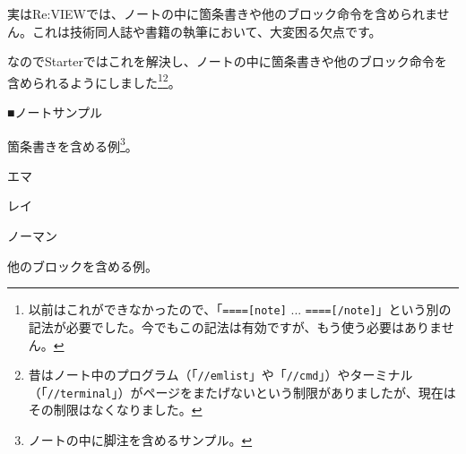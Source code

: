 実はRe:VIEWでは、ノートの中に箇条書きや他のブロック命令を含められません。これは技術同人誌や書籍の執筆において、大変困る欠点です。

なのでStarterではこれを解決し、ノートの中に箇条書きや他のブロック命令を含められるようにしました\footnote{以前はこれができなかったので、「\texttt{====[note]} ... \texttt{====[/note]}」という別の記法が必要でした。今でもこの記法は有効ですが、もう使う必要はありません。}\footnote{昔はノート中のプログラム（「\texttt{//emlist}」や「\texttt{//cmd}」）やターミナル（「\texttt{//terminal}」）がページをまたげないという制限がありましたが、現在はその制限はなくなりました。}。

\begin{starterprogram}\end{starterprogram}
\noindent
{}

\starterresult
\begin{starternote}{■ノートサンプル}
\begin{starternoteinner}

箇条書きを含める例\footnote{ノートの中に脚注を含めるサンプル。}。

\begin{starteritemize}
\item エマ
\item レイ
\item ノーマン
\end{starteritemize}

他のブロックを含める例。

\end{starternoteinner}
\begin{starterprogram}\end{starterprogram}
\begin{starternoteinner}
\end{starternoteinner}
\begin{starterterminal}\end{starterterminal}
\end{starternote}
\endstarterresult

